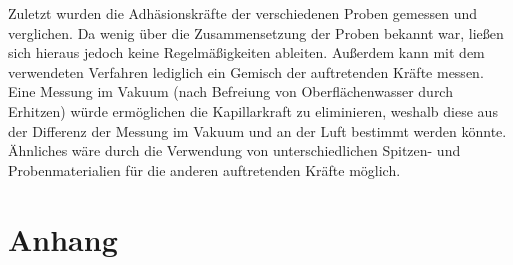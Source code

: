\documentclass[
	a4paper,
	12pt,
	pagesize,
	ngerman
]{scrartcl}
\begin{document}
	Zuletzt wurden die Adhäsionskräfte der verschiedenen Proben gemessen und verglichen.
	Da wenig über die Zusammensetzung der Proben bekannt war, ließen sich hieraus jedoch keine Regelmäßigkeiten ableiten.
	Außerdem kann mit dem verwendeten Verfahren lediglich ein Gemisch der auftretenden Kräfte messen.
	Eine Messung im Vakuum (nach Befreiung von Oberflächenwasser durch Erhitzen) würde ermöglichen die Kapillarkraft zu eliminieren, weshalb diese aus der Differenz der Messung im Vakuum und an der Luft bestimmt werden könnte.
	Ähnliches wäre durch die Verwendung von unterschiedlichen Spitzen- und Probenmaterialien für die anderen auftretenden Kräfte möglich.

	\printbibliography

	\section{Anhang} %
\end{document}

